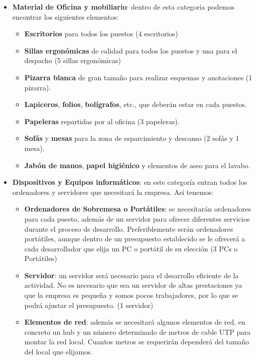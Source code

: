 \begin{itemize}
    \item \textbf{Material de Oficina y mobiliario}: dentro de esta categoría podemos encontrar los siguientes elementos:
    \begin{itemize}
        \item \textbf{Escritorios} para todos los puestos (4 escritorios)
        \item \textbf{Sillas ergonómicas} de calidad para todos los puestos y una para el despacho (5 sillas ergonómicas)
        \item \textbf{Pizarra blanca} de gran tamaño para realizar esquemas y anotaciones (1 pizarra).
        \item \textbf{Lapiceros}, \textbf{folios}, \textbf{bolígrafos}, etc., que deberán estar en cada puestos.
        \item \textbf{Papeleras} repartidas por al oficina (3 papeleras).
        \item \textbf{Sofás} y \textbf{mesas} para la zona de esparcimiento y descanso (2 sofás y 1 mesa).
        \item \textbf{Jabón de manos}, \textbf{papel higiénico} y elementos de aseo para el lavabo.
    \end{itemize}

    \item \textbf{Dispositivos y Equipos informáticos}: en este categoría entran todos los ordenadores y servidores que necesitará la empresa. Así tenemos:

    \begin{itemize}
        \item \textbf{Ordenadores de Sobremesa o Portátiles}: se necesitarán ordenadores para cada puesto, además de un servidor para ofrecer diferentes servicios durante el proceso de desarrollo. Preferiblemente serán ordenadores portátiles, aunque dentro de un
        presupuesto establecido se le ofrecerá a cada desarrollador que elija un PC o portátil de su elección (3 PCs o Portátiles)

        \item \textbf{Servidor}: un servidor será necesario para el desarrollo eficiente de la actividad. No es necesario que sea un servidor de altas prestaciones ya que la empresa es pequeña y somos pocos trabajadores, por lo que se podrá ajustar el presupuesto. (1 servidor)

        \item \textbf{Elementos de red}: además se necesitará algunos elementos de red, en concreto un hub y un número determinado de metros de cable UTP para montar la red local. Cuantos metros se requerirán dependerá del tamaño del local que elijamos.
    \end{itemize}
\end{itemize}

